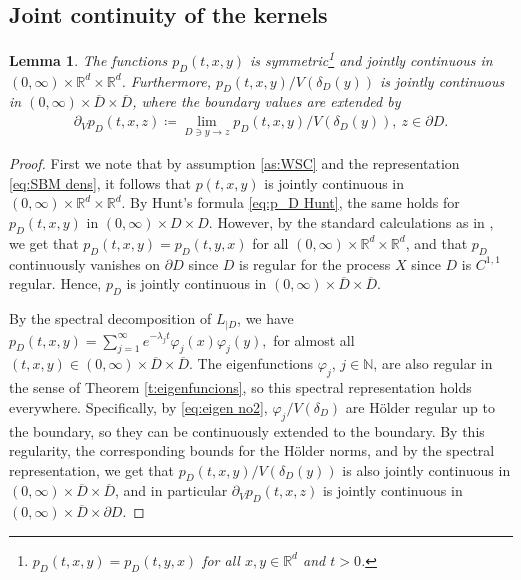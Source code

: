 \documentclass[12pt,a4paper,onecolumn]{article}
\newtheorem{lem}[thm]{Lemma}
\theoremstyle{definition}
\newcommand{\R}{\mathbb{R}}
\newcommand{\N}{\mathbb{N}}
\newcommand{\1}{\mathbf 1}
\newcommand{\de}{\delta_D}
\newcommand{\Lbase}{L_{|D}}
\numberwithin{equation}{section}
\begin{document}
    \subsection{Joint continuity of the kernels}
	\begin{lem}\label{ap:l:joint p_D}
            The functions $p_D(t,x,y)$ is symmetric\footnote{$p_D(t,x,y)=p_D(t,y,x)$ for all $x,y\in \R^d$ and $t>0$.} and jointly continuous in $(0,\infty)\times \R^d\times  \R^d$.
            Furthermore, $p_D(t,x,y)/V(\de(y))$ is jointly continuous in $(0,\infty)\times \overline D\times  \overline D$, where the boundary values are extended by
            \begin{align*}
                \partial_V p_D(t,x,z)\coloneqq\lim_{D\ni y\to z}p_D(t,x,y)/V(\de(y)), \ z\in \partial D.
            \end{align*}
    \end{lem}
    \begin{proof}
    First we note that by assumption \ref{as:WSC} and the representation \eqref{eq:SBM dens}, it follows that $p(t,x,y)$ is jointly continuous in $(0,\infty)\times \R^d\times \R^d$. By Hunt's formula \eqref{eq:p_D Hunt}, the same holds for $p_D(t,x,y)$ in $(0,\infty)\times D\times D$. However, by the standard calculations as in \cite[Section 2]{chung_zhao}, we get that $p_D(t,x,y)=p_D(t,y,x)$ for all $(0,\infty)\times \R^d\times  \R^d$, and that $p_D$ continuously vanishes on $\partial D$ since $D$ is regular for the process $X$ since $D$ is $C^{1,1}$ regular. Hence, $p_D$ is jointly continuous in $(0,\infty)\times \overline D\times  \overline D$.
        
    By the spectral decomposition of $\Lbase$, we have $p_D(t,x,y)=\sum_{j=1}^{\infty} e^{-\lambda_j t}\varphi_j(x)\varphi_j(y),$
        for almost all $(t,x,y)\in (0,\infty)\times \overline D\times  \overline D$. The eigenfunctions $\varphi_j$, $j\in \N$, are also regular in the sense of Theorem \ref{t:eigenfuncions}, so this spectral representation holds everywhere. %
        Specifically, by \eqref{eq:eigen no2}, $\varphi_j /V(\de)$ are H\"older regular up to the boundary, so they can be continuously extended to the boundary. By this regularity, the corresponding bounds for the H\"older norms, and by the spectral representation, we get that $p_D(t,x,y)/V(\de(y))$ is also jointly continuous in $(0,\infty)\times \overline D\times  \overline D$, and in particular $\partial_V p_D(t,x,z)$ is jointly continuous in $(0,\infty)\times \overline D\times  \partial D$.
    \end{proof}
\end{document}
